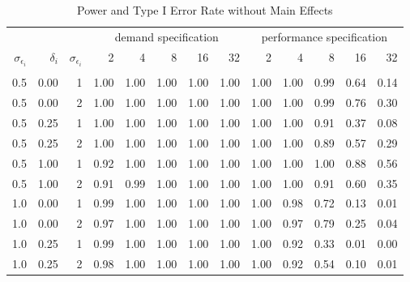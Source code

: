 \begin{table}

\caption{\label{tab:big-basis-table}Power and Type I Error Rate without Main Effects}
\centering
\fontsize{9}{11}\selectfont
\begin{threeparttable}
\begin{tabular}[t]{rrrrrrrrrrrrr}
\toprule
\multicolumn{3}{c}{ } & \multicolumn{5}{c}{demand specification} & \multicolumn{5}{c}{performance specification} \\
\cmidrule(l{3pt}r{3pt}){4-8} \cmidrule(l{3pt}r{3pt}){9-13}
$\sigma_{\epsilon_i}$ & $\delta_i$ & $\sigma_{\epsilon_i}$ & 2 & 4 & 8 & 16 & 32 & 2 & 4 & 8 & 16 & 32\\
\midrule
\addlinespace[0.3em]
\multicolumn{13}{c}{\textbf{Power}}\\
\hspace{1em}0.5 & 0.00 & 1 & 1.00 & 1.00 & 1.00 & 1.00 & 1.00 & 1.00 & 1.00 & 0.99 & 0.64 & 0.14\\
\hspace{1em}0.5 & 0.00 & 2 & 1.00 & 1.00 & 1.00 & 1.00 & 1.00 & 1.00 & 1.00 & 0.99 & 0.76 & 0.30\\
\hspace{1em}0.5 & 0.25 & 1 & 1.00 & 1.00 & 1.00 & 1.00 & 1.00 & 1.00 & 1.00 & 0.91 & 0.37 & 0.08\\
\hspace{1em}0.5 & 0.25 & 2 & 1.00 & 1.00 & 1.00 & 1.00 & 1.00 & 1.00 & 1.00 & 0.89 & 0.57 & 0.29\\
\hspace{1em}0.5 & 1.00 & 1 & 0.92 & 1.00 & 1.00 & 1.00 & 1.00 & 1.00 & 1.00 & 1.00 & 0.88 & 0.56\\
\hspace{1em}0.5 & 1.00 & 2 & 0.91 & 0.99 & 1.00 & 1.00 & 1.00 & 1.00 & 1.00 & 0.91 & 0.60 & 0.35\\
\hspace{1em}1.0 & 0.00 & 1 & 0.99 & 1.00 & 1.00 & 1.00 & 1.00 & 1.00 & 0.98 & 0.72 & 0.13 & 0.01\\
\hspace{1em}1.0 & 0.00 & 2 & 0.97 & 1.00 & 1.00 & 1.00 & 1.00 & 1.00 & 0.97 & 0.79 & 0.25 & 0.04\\
\hspace{1em}1.0 & 0.25 & 1 & 0.99 & 1.00 & 1.00 & 1.00 & 1.00 & 1.00 & 0.92 & 0.33 & 0.01 & 0.00\\
\hspace{1em}1.0 & 0.25 & 2 & 0.98 & 1.00 & 1.00 & 1.00 & 1.00 & 1.00 & 0.92 & 0.54 & 0.10 & 0.01\\

\end{tabular}
\end{threeparttable}
\end{table}
